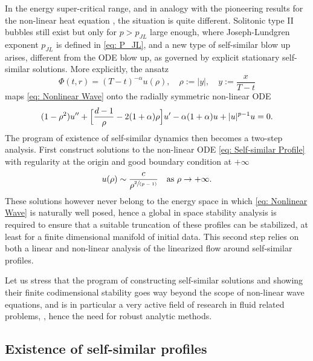 \documentclass[JEP,XML,SOM,Unicode]{cedram}
\newcommand{\spfrac}[2]{\sfrac{#1}{(#2)}}
\theoremstyle{plain}
\theoremstyle{definition}
\begin{document}
In the energy super-critical range, and in analogy with the pioneering results for the non-linear heat equation \cite{HV, MaMe1, MaMe2,CMRcylind}, the situation is quite different. Solitonic type II bubbles still exist but only for $p>p_{JL}$ large enough, \cite{MRRnls, C} where Joseph-Lundgren exponent $p_{JL}$ is defined in \eqref{eq: P_JL}, and a new type of self-similar blow up arises, different from the ODE blow up, as governed by explicit stationary self-similar solutions. More explicitly, the ansatz
\begin{equation}
\label{eq: Ansatz}
\Phi(t,r)=(T-t)^{-\alpha}u(\rho),\quad \rho:=|y|,\quad y:=\frac{x}{T-t}
\end{equation}
maps \eqref{eq: Nonlinear Wave} onto the radially symmetric non-linear ODE
\begin{equation}
\label{eq: Self-similar Profile}
(1-\rho^2)u''+\Bigl[\frac{d-1}{\rho}-2(1+\alpha)\rho\Bigr]u'-\alpha(1+\alpha)u+|u|^{p-1}u=0.
\end{equation}
The program of existence of self-similar dynamics then becomes a two-step analysis. First construct solutions to the non-linear ODE \eqref{eq: Self-similar Profile} with regularity at the origin and good boundary condition at $+\infty$
\[
u(\rho)\sim \frac{c}{\rho^{\spfrac 2{p-1}}}\quad \mbox{as} \ \rho\to+\infty.
\]
These solutions however never belong to the energy space in which \eqref{eq: Nonlinear Wave} is naturally well posed, hence a global in space stability analysis is required to ensure that a suitable truncation of these profiles can be stabilized, at least for a finite dimensional manifold of initial data. This second step relies on both a linear and non-linear analysis of the linearized flow around self-similar profiles.

Let us stress that the program of constructing self-similar solutions and showing their finite codimensional stability goes way beyond the scope of non-linear wave equations, and is in particular a very active field of research in fluid related problems, \cite{MRRS}, hence the need for robust analytic methods.

\subsection{Existence of self-similar profiles}
\end{document}
